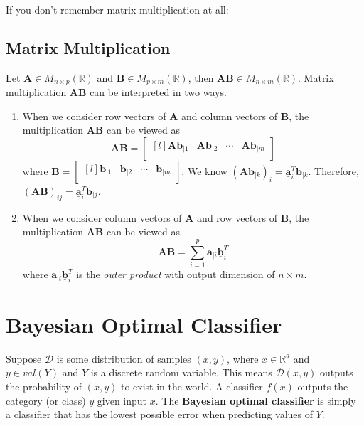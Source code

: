\documentclass[12pt]{article}
\newcommand{\ul}[1]{\underline{#1}}
\theoremstyle{definition}
\begin{document}
\noindent If you don't remember matrix multiplication at all:

\subsection{Matrix Multiplication} 
Let $\bm{A}\in M_{n\times p}(\mathbb{R})$ and $\bm{B}\in M_{p\times m}(\mathbb{R})$, then $\bm{A}\bm{B}\in M_{n\times m}(\mathbb{R})$. Matrix multiplication $\bm{AB}$ can be interpreted in two ways.

\begin{enumerate}[label=\theenumi)]
    \item When we consider row vectors of $\bm{A}$ and column vectors of $\bm{B}$, the multiplication $\bm{AB}$ can be viewed as
        \begin{equation}
            \bm{A}\bm{B} =  \begin{bmatrix*}[l]
            \bm{Ab}_{|1} & \bm{Ab}_{|2} & \cdots & \bm{Ab}_{|m}\\
            \end{bmatrix*}
        \end{equation}
    where $\bm{B}=\begin{bmatrix*}[l]
        \bm{b}_{|1} & \bm{b}_{|2} & \cdots & \bm{b}_{|m}\\
        \end{bmatrix*}$. We know $(\bm{Ab}_{|k})_i=\bm{\ul{a}}_i^T\bm{b}_{|k}$. Therefore, $(\bm{AB})_{ij}=\bm{\ul{a}}_i^T\bm{b}_{|j}$.
        
    \item When we consider column vectors of $\bm{A}$ and row vectors of $\bm{B}$, the multiplication $\bm{AB}$ can be viewed as 
    \begin{equation}\label{eq:mmult_2}
        \bm{AB}=\sum_{i=1}^{p}\bm{a}_{|i}\bm{\ul{b}}_i^T
    \end{equation}
    where $\bm{a}_{|i}\bm{\ul{b}}_i^T$ is the \emph{outer product} with output dimension of $n\times m$.
\end{enumerate} 


\section{Bayesian Optimal Classifier}

Suppose $\mathcal{D}$ is some distribution of samples $(x,y)$, where $x\in\mathbb{R}^d$ and $y\in val(Y)$ and $Y$ is a discrete random variable. This means $\mathcal{D}(x,y)$ outputs the probability of $(x,y)$ to exist in the world. A classifier $f(x)$ outputs the category (or class) $y$ given input $x$. The \textbf{Bayesian optimal classifier} is simply a classifier that has the lowest possible error when predicting values of $Y$.
\end{document}
